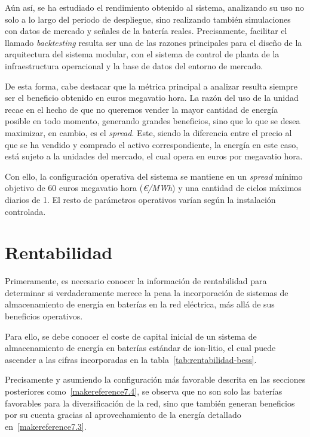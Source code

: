 Aún así, se ha estudiado el rendimiento obtenido al sistema, analizando su uso no solo a lo largo del periodo de despliegue, sino realizando también simulaciones con datos de mercado y señales de la batería reales. Precisamente, facilitar el llamado \textit{backtesting} resulta ser una de las razones principales para el diseño de la arquitectura del sistema modular, con el sistema de control de planta de la infraestructura operacional y la base de datos del entorno de mercado.

De esta forma, cabe destacar que la métrica principal a analizar resulta siempre ser el beneficio obtenido en euros megavatio hora. La razón del uso de la unidad recae en el hecho de que no queremos vender la mayor cantidad de energía posible en todo momento, generando grandes beneficios, sino que lo que se desea maximizar, en cambio, es el \textit{spread}. Este, siendo la diferencia entre el precio al que se ha vendido y comprado el activo correspondiente, la energía en este caso, está sujeto a la unidades del mercado, el cual opera en euros por megavatio hora.

Con ello, la configuración operativa del sistema se mantiene en un \textit{spread} mínimo objetivo de 60 euros megavatio hora (\textit{€/MWh}) y una cantidad de ciclos máximos diarios de 1. El resto de parámetros operativos varían según la instalación controlada.

\section{Rentabilidad}
\label{makereference7.1}

Primeramente, es necesario conocer la información de rentabilidad para determinar si verdaderamente merece la pena la incorporación de sistemas de almacenamiento de energía en baterías en la red eléctrica, más allá de sus beneficios operativos.

Para ello, se debe conocer el coste de capital inicial de un sistema de almacenamiento de energía en baterías estándar de ion-litio, el cual puede ascender a las cifras incorporadas en la tabla~\ref{tab:rentabilidad-bess}.

Precisamente y asumiendo la configuración más favorable descrita en las secciones posteriores como~\ref{makereference7.4}, se observa que no son solo las baterías favorables para la diversificación de la red, sino que también generan beneficios por su cuenta gracias al aprovechamiento de la energía detallado en~\ref{makereference7.3}.

